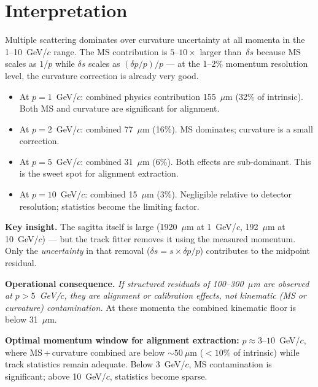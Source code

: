 \documentclass[11pt,a4paper]{article}
\begin{document}
\section{Interpretation}

Multiple scattering dominates over curvature uncertainty at all momenta
in the 1--10~GeV/$c$ range.  The MS contribution is $5$--$10\times$
larger than~$\delta s$ because MS scales as $1/p$ while $\delta s$
scales as $(\delta p/p)/p$ --- at the 1--2\% momentum resolution level,
the curvature correction is already very good.

\begin{itemize}
\item At $p = 1$~GeV/$c$: combined physics contribution 155~$\mu$m
      (32\% of intrinsic).  Both MS and curvature are significant for
      alignment.

\item At $p = 2$~GeV/$c$: combined 77~$\mu$m (16\%).  MS dominates;
      curvature is a small correction.

\item At $p = 5$~GeV/$c$: combined 31~$\mu$m (6\%).  Both effects are
      sub-dominant.  This is the sweet spot for alignment extraction.

\item At $p = 10$~GeV/$c$: combined 15~$\mu$m (3\%).  Negligible
      relative to detector resolution; statistics become the limiting
      factor.
\end{itemize}

\medskip
\noindent\textbf{Key insight.}
The sagitta itself is large (1920~$\mu$m at 1~GeV/$c$, 192~$\mu$m at
10~GeV/$c$) --- but the track fitter removes it using the measured
momentum.  Only the \emph{uncertainty} in that removal ($\delta s =
s \times \delta p/p$) contributes to the midpoint residual.

\medskip
\noindent\textbf{Operational consequence.}
\emph{If structured residuals of 100--300~$\mu$m are observed at
$p > 5$~GeV/$c$, they are alignment or calibration effects, not
kinematic (MS or curvature) contamination.}
At these momenta the combined kinematic floor is below 31~$\mu$m.

\medskip
\noindent\textbf{Optimal momentum window for alignment extraction:}
$p \approx 3$--$10$~GeV/$c$, where MS\,+\,curvature combined are
below ${\sim}50~\mu$m (${<}10\%$ of intrinsic) while track statistics
remain adequate.  Below 3~GeV/$c$, MS contamination is significant;
above 10~GeV/$c$, statistics become sparse.
\end{document}

